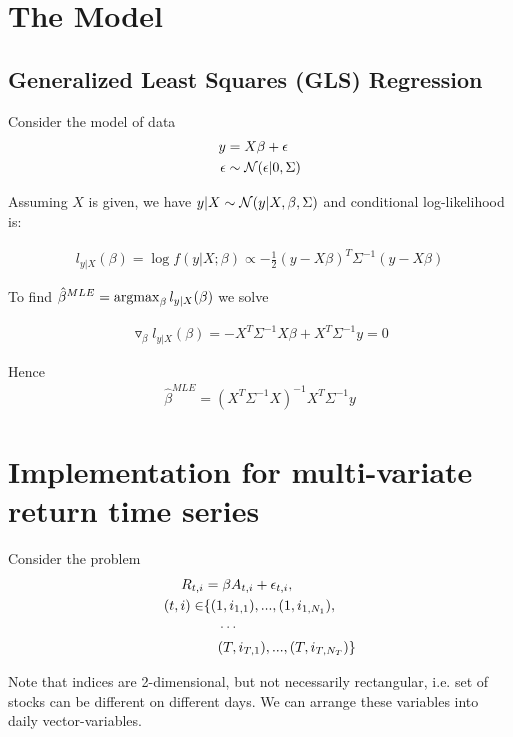 \section{The Model}
\subsection{Generalized Least Squares (GLS) Regression}
Consider the model of data
\begin{align}
	y &= X \beta + \epsilon  \\
	\epsilon &\sim \mathcal{N}(\epsilon| 0, \Sigma) \nonumber
\end{align}

Assuming $X$ is given, we have $y|X \sim \mathcal{N}(y| X, \beta, \Sigma)$ and conditional log-likelihood is:

\begin{align*}
	l_{y|X}(\beta) = \log f(y|X; \beta) \propto -\frac{1}{2} (y - X\beta)^T \Sigma^{-1} (y - X \beta)
\end{align*}

To find $\hat{\beta}^{MLE} = \operatorname*{argmax}_\beta  l_{y|X}(\beta)$ we solve


\begin{align*}
	\triangledown_{\beta} l_{y|X}(\beta) = - X^T \Sigma^{-1} X \beta + X^T \Sigma^{-1} y = 0
\end{align*}

Hence
\begin{align}
	\label{eq:beta_mle}
	\hat{\beta}^{MLE} = (X^T \Sigma^{-1} X)^{-1} X^T \Sigma^{-1} y
\end{align}


\section{Implementation for multi-variate return time series}
Consider the problem 
\begin{align}\label{eq:return_alpha}
	R_{t,i} &= \beta A_{t,i} + \epsilon_{t,i}, \\
	(t,i) \in &\{(1, i_{1,1}),...,(1, i_{1, N_1}),\notag\\
	&\phantom{\in\ }\cdots\notag\\
	&\phantom{\in\ }(T, i_{T,1}),...,(T, i_{T, N_T})\} \notag
\end{align}


Note that indices are 2-dimensional, but not necessarily rectangular, i.e. set of stocks can be different on different days. We can arrange these variables into daily vector-variables.


